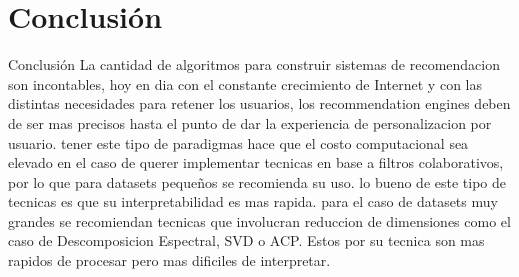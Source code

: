 \documentclass[10pt]{beamer}
\begin{document}
\section{Conclusión}

\begin{frame}{Conclusión}
La cantidad de algoritmos para construir sistemas de recomendacion son incontables, hoy en dia con el constante crecimiento de Internet
y con las distintas necesidades para retener los usuarios, los recommendation engines deben de ser mas precisos hasta el punto de 
dar la experiencia de personalizacion por usuario. tener este tipo de paradigmas hace que el costo computacional sea elevado en el 
caso de querer implementar tecnicas en base a filtros colaborativos, por lo que para datasets pequeños se recomienda su uso. lo bueno
de este tipo de tecnicas es que su interpretabilidad es mas rapida. para el caso de datasets muy grandes se recomiendan tecnicas que involucran 
reduccion de dimensiones como el caso de Descomposicion Espectral, SVD o ACP. Estos por su tecnica son mas rapidos de procesar
pero mas dificiles de interpretar. 
\end{frame}
\end{document}
